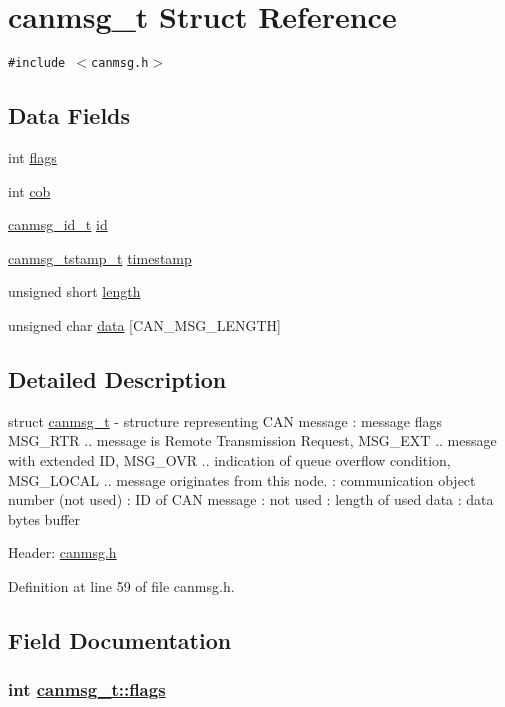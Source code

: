 \hypertarget{structcanmsg__t}{
\section{canmsg\_\-t Struct Reference}
\label{structcanmsg__t}
}
{\tt \#include $<$canmsg.h$>$}

\subsection*{Data Fields}
\begin{CompactItemize}
\item 
int \hyperlink{structcanmsg__t_beea8084650640976b9c94257623b735}{flags}
\item 
int \hyperlink{structcanmsg__t_2a9a1988755a4f92d5706f02cf5001f9}{cob}
\item 
\hyperlink{canmsg_8h_4df2eff676652dbe67d372e42ccf8aa7}{canmsg\_\-id\_\-t} \hyperlink{structcanmsg__t_9ca617a401250c914820ae4ed2768725}{id}
\item 
\hyperlink{canmsg_8h_f5a9ea1b33e64787190dccc1ce5419a2}{canmsg\_\-tstamp\_\-t} \hyperlink{structcanmsg__t_11568aa34f1851a87de25f6f0d6bbf8f}{timestamp}
\item 
unsigned short \hyperlink{structcanmsg__t_9b2006e54552e02778eea1da3ac52070}{length}
\item 
unsigned char \hyperlink{structcanmsg__t_778d41b22a1ae1f0da4631885239a10c}{data} \mbox{[}CAN\_\-MSG\_\-LENGTH\mbox{]}
\end{CompactItemize}


\subsection{Detailed Description}
struct \hyperlink{structcanmsg__t}{canmsg\_\-t} - structure representing CAN message : message flags MSG\_\-RTR .. message is Remote Transmission Request, MSG\_\-EXT .. message with extended ID, MSG\_\-OVR .. indication of queue overflow condition, MSG\_\-LOCAL .. message originates from this node. : communication object number (not used) : ID of CAN message : not used : length of used data : data bytes buffer

Header: \hyperlink{canmsg_8h}{canmsg.h} 



Definition at line 59 of file canmsg.h.

\subsection{Field Documentation}
\hypertarget{structcanmsg__t_beea8084650640976b9c94257623b735}{
\subsubsection[flags]{\setlength{\rightskip}{0pt plus 5cm}int \hyperlink{structcanmsg__t_beea8084650640976b9c94257623b735}{canmsg\_\-t::flags}}}
\label{structcanmsg__t_beea8084650640976b9c94257623b735}





